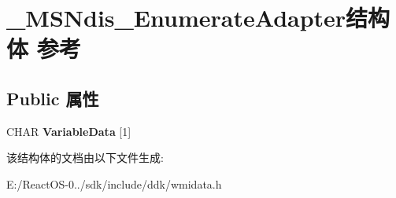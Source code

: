 \hypertarget{struct___m_s_ndis___enumerate_adapter}{}\section{\+\_\+\+M\+S\+Ndis\+\_\+\+Enumerate\+Adapter结构体 参考}
\label{struct___m_s_ndis___enumerate_adapter}
\subsection*{Public 属性}
\begin{DoxyCompactItemize}
\item 
\mbox{\label{struct___m_s_ndis___enumerate_adapter_a47a16371765ccf22df288acc77aded60}} 
C\+H\+AR {\bfseries Variable\+Data} \mbox{[}1\mbox{]}
\end{DoxyCompactItemize}


该结构体的文档由以下文件生成\+:\begin{DoxyCompactItemize}
\item 
E\+:/\+React\+O\+S-\/0../sdk/include/ddk/wmidata.\+h\end{DoxyCompactItemize}
